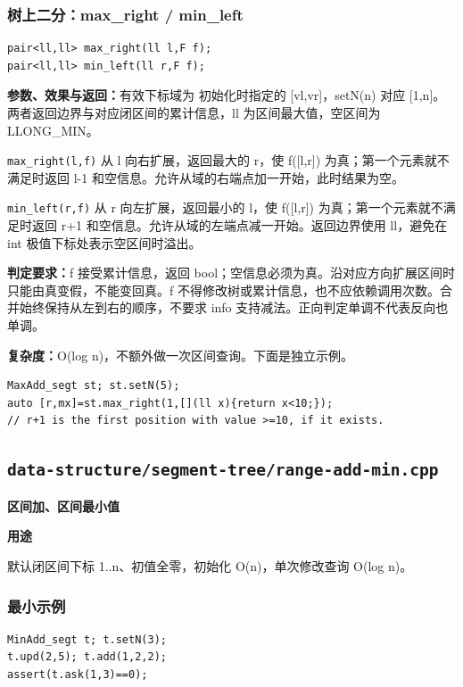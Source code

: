\documentclass[UTF8,a4paper,10pt]{ctexart}
\newcommand{\TemplUsage}[1]{\textbf{用途}\par #1\par}
\begin{document}
\noindent\begin{minipage}{\textwidth}
\subsubsection*{树上二分：max\_right / min\_left}
\begin{lstlisting}
pair<ll,ll> max_right(ll l,F f);
pair<ll,ll> min_left(ll r,F f);
\end{lstlisting}
\textbf{参数、效果与返回：}有效下标域为 初始化时指定的 [vl,vr]，setN(n) 对应 [1,n]。两者返回边界与对应闭区间的累计信息，ll 为区间最大值，空区间为 LLONG\_MIN。

\texttt{max\_right(l,f)} 从 l 向右扩展，返回最大的 r，使 f([l,r]) 为真；第一个元素就不满足时返回 l-1 和空信息。允许从域的右端点加一开始，此时结果为空。

\texttt{min\_left(r,f)} 从 r 向左扩展，返回最小的 l，使 f([l,r]) 为真；第一个元素就不满足时返回 r+1 和空信息。允许从域的左端点减一开始。返回边界使用 ll，避免在 int 极值下标处表示空区间时溢出。

\textbf{判定要求：}f 接受累计信息，返回 bool；空信息必须为真。沿对应方向扩展区间时只能由真变假，不能变回真。f 不得修改树或累计信息，也不应依赖调用次数。合并始终保持从左到右的顺序，不要求 info 支持减法。正向判定单调不代表反向也单调。

\textbf{复杂度：}O(log n)，不额外做一次区间查询。下面是独立示例。
\begin{lstlisting}
MaxAdd_segt st; st.setN(5);
auto [r,mx]=st.max_right(1,[](ll x){return x<10;});
// r+1 is the first position with value >=10, if it exists.
\end{lstlisting}

\end{minipage}\par
\clearpage
\subsection{\texttt{data-structure/segment-tree/range-add-min.cpp}}
\textbf{区间加、区间最小值}\par
\TemplUsage{默认闭区间下标 1..n、初值全零，初始化 O(n)，单次修改查询 O(log n)。}
\subsubsection*{最小示例}
\begin{lstlisting}
MinAdd_segt t; t.setN(3);
t.upd(2,5); t.add(1,2,2);
assert(t.ask(1,3)==0);
\end{lstlisting}
\end{document}
